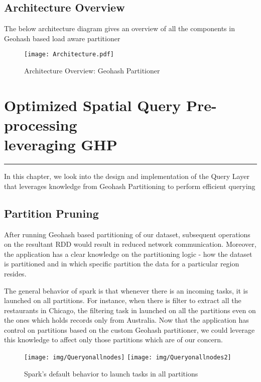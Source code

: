 \documentclass[article,type=msc,colorback,12pt,accentcolor=tud1d]{tudthesis}
\begin{document}
			
			\clearpage
			\subsection{Architecture Overview}
				\par The below architecture diagram gives an overview of all the components in Geohash based load aware partitioner \\
				\begin{figure}[h]
					\centering
					\texttt{[image: Architecture.pdf]}
					\caption{Architecture Overview: Geohash Partitioner}
					\label{fig:Architecture}
				\end{figure}
				
			
			
	  \cleardoublepage
	\hfill
	\section[Optimized Spatial Query Pre-processing leveraging GHP] {Optimized Spatial Query Pre-processing \\leveraging GHP}
	\hfill \hrule	\hfill 
	
		\par In this chapter, we look into the design and implementation of the Query Layer that leverages knowledge from Geohash Partitioning to perform efficient querying 
		\subsection{Partition Pruning}
			\par After running Geohash based partitioning of our dataset, subsequent operations on the resultant RDD would result in reduced network communication. Moreover, the application has a clear knowledge on the partitioning logic - how the dataset is partitioned and in which specific partition the data for a particular region resides.
			
			The general behavior of spark is that whenever there is an incoming tasks, it is launched on all partitions. For instance, when there is filter to extract all the restaurants in Chicago, the filtering task in launched on all the partitions even on the ones which holds records only from Australia. Now that the application has control on partitions based on the custom Geohash partitioner, we could leverage this knowledge to affect only those partitions which are of our concern. 
			
			
				\begin{figure}[p]
				\centering
				\texttt{[image: img/Queryonallnodes]}
				\texttt{[image: img/Queryonallnodes2]}
				\caption{Spark's default behavior to launch tasks in all partitions}
				\label{fig:Queryonallnodes2}
				\end{figure}
				
\end{document}
